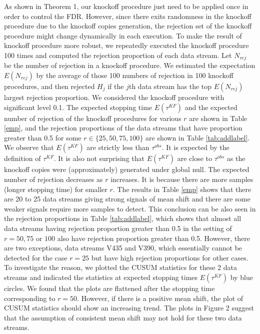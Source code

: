 \documentclass[]{interact}
\theoremstyle{plain}%
\theoremstyle{definition}
\theoremstyle{remark}
\begin{document}
As shown in Theorem 1, our knockoff procedure just need to be applied once in order to control the FDR. However, since there exits randomness in the knockoff procedure due to the knockoff copies generation, the rejection set of the knockoff procedure might change dynamically in each execution. To make the result of knockoff procedure more robust, we repeatedly executed the knockoff procedure 100 times and computed the rejection proportion of each data stream. Let $N_{rej}$ be the number of rejection in a knockoff procedure. We estimated the expectation $E(N_{rej})$ by the average of those 100 numbers of rejection in 100 knockoff procedures, and then rejected $H_j$ if the $j$th data stream has the top $E(N_{rej})$ largest rejection proportion. We considered the knockoff procedure with significant level 0.1. The expected stopping time $E(\tau^{KF})$ and the expected number of rejection of the knockoff procedures for various $r$ are shown in Table \ref{emp}, and the rejection proportions of the data streams that have proportion greater than 0.5 for some $r\in\{25,50,75,100\}$ are shown in Table \ref{tab:addlabel}. We observe that $E(\tau^{KF})$ are strictly less than $\tau^{obs}$. It is expected by the definition of $\tau^{KF}$. It is also not surprising that $E(\tau^{KF})$ are close to $\tau^{obs}$ as the knockoff copies were (approximately) generated under global null. The expected number of rejection decreases as $r$ increases. It is because there are more samples (longer stopping time) for smaller $r$. The results in Table \ref{emp} shows that there are 20 to 25 data streams giving strong signals of mean shift and there are some weaker signals require more samples to detect. This conclusion can be also seen in the rejection proportions in Table \ref{tab:addlabel}, which shows that almost all data streams having rejection proportion greater than 0.5 in the setting of $r=50,75$ or $100$ also have rejection proportion greater than 0.5. However, there are two exceptions, data streams V435 and V390, which essentially cannot be detected for the case $r=25$ but have high rejection proportions for other cases. To investigate the reason, we plotted the CUSUM statistics for these 2 data streams and indicated the statistics at expected stopping times $E(\tau^{KF})$ by blue circles. We found that the plots are flattened after the stopping time corresponding to $r=50$. However, if there is a positive mean shift, the plot of CUSUM statistics should show an increasing trend. The plots in Figure 2 suggest that the assumption of consistent mean shift may not hold for these two data streams.   
\end{document}

